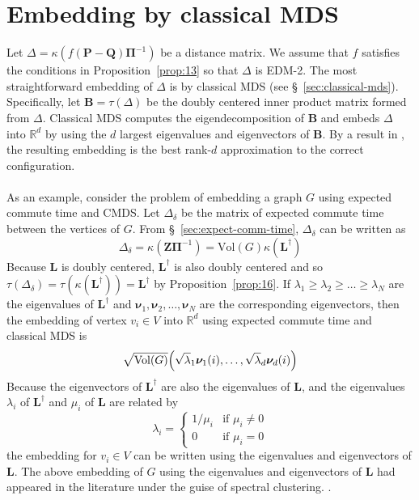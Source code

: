 \section{Embedding by classical MDS}
\label{sec:embedd-class-mds}
Let $\Delta = \kappa(f(\mathbf{P} - \mathbf{Q})\bm{\Pi}^{-1})$ be a
distance matrix. We assume that $f$ satisfies the conditions in
Proposition~\ref{prop:13} so that $\Delta$ is EDM-2. The most
straightforward embedding of $\Delta$ is by classical MDS (see
\S~\ref{sec:classical-mds}). Specifically, let $\mathbf{B} =
\tau(\Delta)$ be the doubly centered inner product matrix formed from
$\Delta$. Classical MDS computes the eigendecomposition of
$\mathbf{B}$ and embeds $\Delta$ into $\mathbb{R}^{d}$ by using the
$d$ largest eigenvalues and eigenvectors of $\mathbf{B}$. By a result
in \cite{eckart36:_approx}, the resulting embedding is the
best rank-$d$ approximation to the correct configuration. \\ \\
\noindent
As an example, consider the problem of embedding a graph $G$ using
expected commute time and CMDS\@. Let $\Delta_\delta$ be the
matrix of expected commute time between the vertices of $G$. From
\S~\ref{sec:expect-comm-time}, $\Delta_{\delta}$ can be written as
\begin{equation*}
  \Delta_{\delta} = \kappa(\mathbf{Z}\bm{\Pi}^{-1}) = \mathrm{Vol}(G)
  \kappa(\mathbf{L}^{\dagger})
\end{equation*}
Because $\mathbf{L}$ is doubly centered, $\mathbf{L}^{\dagger}$ is
also doubly centered and so $\tau(\Delta_{\delta}) =
\tau(\kappa(\mathbf{L}^{\dagger})) = \mathbf{L}^{\dagger}$ by
Proposition~\ref{prop:16}. If $\lambda_1 \geq \lambda_2 \geq \dots \geq
\lambda_N$ are the eigenvalues of $\mathbf{L}^{\dagger}$ and
$\bm{\nu}_1, \bm{\nu}_2, \dots, \bm{\nu}_N$ are the corresponding
eigenvectors, then the embedding of vertex $v_i \in V$ into
$\mathbb{R}^{d}$ using expected commute time and classical MDS is
\begin{equation}
  \label{eq:33}
  \sqrt{\mathrm{Vol}(G)} 
\Bigl(\sqrt{\lambda}_1 \bm{\nu}_1(i), \dots, \sqrt{\lambda}_d \bm{\nu}_d(i) \Bigr)
\end{equation}
Because the eigenvectors of $\mathbf{L}^{\dagger}$ are also the
eigenvalues of $\mathbf{L}$, and the eigenvalues $\lambda_i$ of  
$\mathbf{L}^{\dagger}$ and $\mu_i$ of $\mathbf{L}$ are related by
\begin{equation}
  \label{eq:53}
  \lambda_i = \begin{cases}
    1/\mu_i & \text{if $\mu_i \not = 0$} \\
    0 & \text{if $\mu_i = 0$}
    \end{cases}
\end{equation}
the embedding for $v_i \in V$ can be written using the eigenvalues and
eigenvectors of $\mathbf{L}$. The above embedding of $G$ using the
eigenvalues and eigenvectors of $\mathbf{L}$ had appeared in the
literature under the guise of spectral clustering.
\citep{yen07:_graph,luxburg07:_tutor_spect_clust}.
